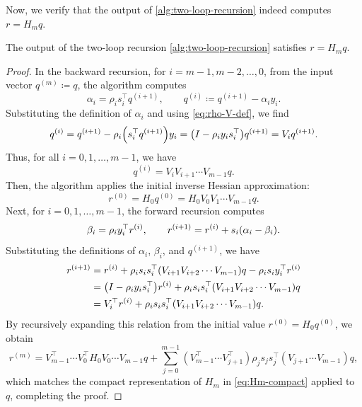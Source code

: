 \documentclass[0_en]{subfiles}
\begin{document}
Now, we verify that the output of \cref{alg:two-loop-recursion} indeed computes $r = H_m q$.
\begin{proposition}
    The output of the two-loop recursion \cref{alg:two-loop-recursion} satisfies $r = H_m q$.
\end{proposition}
\begin{proof}
    In the backward recursion, for $i = m-1, m-2, \dots, 0$, from the input vector $q^{(m)} \coloneqq q$, the algorithm computes
    \begin{equation}
        \alpha_i   = \rho_i s_i^\top q^{(i+1)}, \qquad
        q^{(i)} \coloneqq q^{(i+1)} - \alpha_i y_i.
    \end{equation}
    Substituting the definition of $\alpha_i$ and using \cref{eq:rho-V-def}, we find
    \begin{equation*}
        q^{(i)} = q^{(i+1)} - \rho_i \qty(s_i^\top q^{(i+1)}) y_i = \qty(I - \rho_i y_i s_i^\top) q^{(i+1)} = V_i q^{(i+1)}.
    \end{equation*}
    Thus, for all $i = 0, 1, \dots, m-1$, we have
    \begin{equation*}
        q^{(i)} = V_i V_{i+1} \cdots V_{m-1} q.
    \end{equation*}
    Then, the algorithm applies the initial inverse Hessian approximation:
    \begin{equation*}
        r^{(0)} = H_0 q^{(0)} = H_0 V_0 V_1 \cdots V_{m-1} q.
    \end{equation*}
    Next, for $i = 0, 1, \dots, m-1$, the forward recursion computes
    \begin{equation*}
        \beta_i     = \rho_i y_i^\top r^{(i)}, \qquad
        r^{(i+1)}   = r^{(i)} + s_i \qty(\alpha_i - \beta_i).
    \end{equation*}
    Substituting the definitions of $\alpha_i$, $\beta_i$, and $q^{(i+1)}$, we have
    \begin{align*}
        r^{(i+1)}
         & =
        r^{(i)} + \rho_i s_i s_i^\top \qty(V_{i+1} V_{i+2} \cdots V_{m-1}) q - \rho_i s_i y_i^\top r^{(i)}     \\
         & = \qty(I- \rho_i y_i s_i^\top) r^{(i)} + \rho_i s_i s_i^\top \qty(V_{i+1} V_{i+2} \cdots V_{m-1}) q \\
         & =
        V_i^\top r^{(i)}
        +
        \rho_i s_i s_i^\top
        \qty(V_{i+1} V_{i+2} \cdots V_{m-1}) q.
    \end{align*}
    By recursively expanding this relation from the initial value $r^{(0)} = H_0 q^{(0)}$, we obtain
    \begin{equation}
        r^{(m)}
        =
        V_{m-1}^\top \cdots V_0^\top H_0 V_0 \cdots V_{m-1} q
        +
        \sum_{j=0}^{m-1}
        (V_{m-1}^\top \cdots V_{j+1}^\top)
        \rho_j s_j s_j^\top
        (V_{j+1} \cdots V_{m-1}) q,
    \end{equation}
    which matches the compact representation of $H_m$ in \cref{eq:Hm-compact} applied to $q$, completing the proof.
\end{proof}
\end{document}
